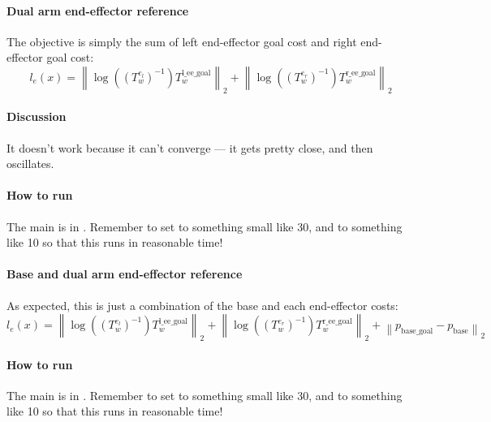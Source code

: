 \paragraph{Dual arm end-effector reference} 
The objective is simply the sum of left end-effector goal cost
and right end-effector goal cost:
\begin{equation}
l_{ e } (x)= \left\lVert 
\log \left( \left( T_{ w }^{ e_{ l } } \right)^{ -1 } \right) T_{ w }^{ \text{l\_ee\_goal} }
\right \rVert _{ 2 }
+ \left\lVert \log \left( \left( T_{ w }^{ e_{ r } } \right)^{ -1 } \right) T_{ w }^{ \text{r\_ee\_goal} }
\right \rVert _{ 2 }
\end{equation}

\paragraph{Discussion}
It doesn't work because it can't converge --- it gets pretty close,
and then oscillates. 

\paragraph{How to run} 
The main is in
.
Remember to set  to something small like 30,
and  to something like 10 
so that this runs in reasonable time!
\paragraph{Base and dual arm end-effector reference}
As expected, this is just a combination of the base and each end-effector costs:
\begin{equation}
l_{ e } (x)= \left\lVert 
\log \left( \left( T_{ w }^{ e_{ l } } \right)^{ -1 } \right) T_{ w }^{ \text{l\_ee\_goal} }
\right \rVert _{ 2 }
+ \left\lVert \log \left( \left( T_{ w }^{ e_{ r } } \right)^{ -1 } \right) T_{ w }^{ \text{r\_ee\_goal} }
\right \rVert _{ 2 }
+ \left\lVert  p_{ \text{base\_goal} }  - p_{ \text{base} }
\right \rVert _{ 2 }
\end{equation}
\paragraph{How to run} 
The main is in
.
Remember to set  to something small like 30,
and  to something like 10 
so that this runs in reasonable time!

